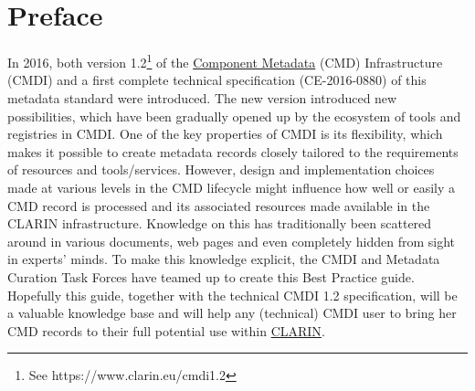 \section{Preface}
In 2016, both version 1.2\footnote{See https://www.clarin.eu/cmdi1.2} of
the
\href{https://www.gitbook.com/book/clarin-eric/cmdi-best-practices/edit\#}{Component
Metadata} (CMD) Infrastructure (CMDI) and a first complete technical
specification (CE-2016-0880) of this metadata standard were introduced.
The new version introduced new possibilities, which have been gradually
opened up by the ecosystem of tools and registries in CMDI. One of the
key properties of CMDI is its flexibility, which makes it possible to
create metadata records closely tailored to the requirements of
resources and tools/services. However, design and implementation choices
made at various levels in the CMD lifecycle might influence how well or
easily a CMD record is processed and its associated resources made
available in the CLARIN infrastructure. Knowledge on this has
traditionally been scattered around in various documents, web pages and
even completely hidden from sight in experts' minds. To make this
knowledge explicit, the CMDI and Metadata Curation Task Forces have
teamed up to create this Best Practice guide. Hopefully this guide,
together with the technical CMDI 1.2 specification, will be a valuable
knowledge base and will help any (technical) CMDI user to bring her CMD
records to their full potential use within
\href{https://www.clarin.eu}{CLARIN}.
